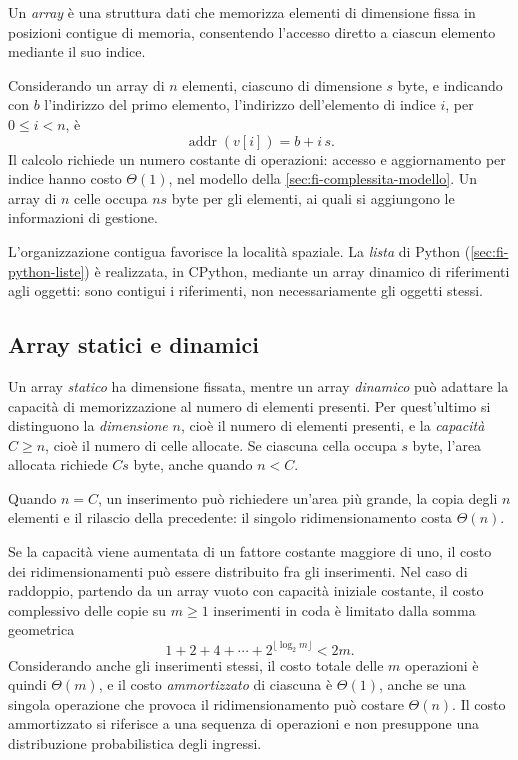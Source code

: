 \begin{definition}[Array]
\label{def:fi-array}
Un \emph{array} è una struttura dati che memorizza elementi di
dimensione fissa in posizioni contigue di memoria, consentendo
l'accesso diretto a ciascun elemento mediante il suo indice.
\end{definition}

Considerando un array di \(n\) elementi, ciascuno di dimensione
\(s\) byte, e indicando con \(b\) l'indirizzo del primo elemento,
l'indirizzo dell'elemento di indice \(i\), per \(0\le i<n\), è
\[
  \operatorname{addr}(v[i])=b+i\,s.
\]
Il calcolo richiede un numero costante di operazioni: accesso e
aggiornamento per indice hanno costo \(\Theta(1)\), nel modello
della \cref{sec:fi-complessita-modello}. Un array di \(n\) celle
occupa \(ns\) byte per gli elementi, ai quali si aggiungono le
informazioni di gestione.

L'organizzazione contigua favorisce la località spaziale.
La \emph{lista} di Python (\cref{sec:fi-python-liste}) è realizzata,
in CPython, mediante un array dinamico di riferimenti agli oggetti:
sono contigui i riferimenti, non necessariamente gli oggetti stessi.

\clearpage

\subsection{Array statici e dinamici}
\label{sec:fi-array-dinamici}

Un array \emph{statico} ha dimensione fissata, mentre un array
\emph{dinamico} può adattare la capacità di memorizzazione al numero
di elementi presenti. Per quest'ultimo si distinguono la
\emph{dimensione} \(n\), cioè il numero di elementi presenti,
e la \emph{capacità} \(C\ge n\), cioè il numero di celle allocate.
Se ciascuna cella occupa \(s\) byte, l'area allocata richiede
\(Cs\) byte, anche quando \(n<C\).

Quando \(n=C\), un inserimento può richiedere un'area più grande,
la copia degli \(n\) elementi e il rilascio della precedente:
il singolo ridimensionamento costa \(\Theta(n)\).

Se la capacità viene aumentata di un fattore costante maggiore di
uno, il costo dei ridimensionamenti può essere distribuito fra
gli inserimenti. Nel caso di raddoppio, partendo da un array vuoto con
capacità iniziale costante, il costo complessivo delle
copie su \(m\ge1\) inserimenti in coda è limitato dalla somma
geometrica
\[
  1+2+4+\cdots+2^{\lfloor\log_2 m\rfloor}<2m.
\]
Considerando anche gli inserimenti stessi, il costo totale delle
\(m\) operazioni è quindi \(\Theta(m)\), e il costo
\emph{ammortizzato} di ciascuna è \(\Theta(1)\), anche se una
singola operazione che provoca il ridimensionamento può costare
\(\Theta(n)\). Il costo ammortizzato si riferisce a una sequenza
di operazioni e non presuppone una distribuzione probabilistica
degli ingressi.


